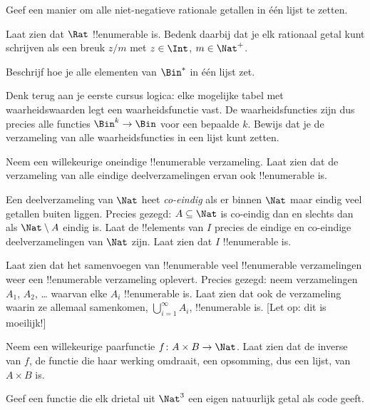 \documentclass[../../../include/open-logic-section]{subfiles}
\begin{document}
\begin{prob}
Geef een manier om alle niet-negatieve rationale getallen in één lijst
te zetten.
\end{prob}

\begin{prob}
Laat zien dat $\Rat$ !!{enumerable} is. Bedenk daarbij dat je elk
rationaal getal kunt schrijven als een breuk $z/m$ met $z \in \Int$,
$m \in \Nat^+$.
\end{prob}

\begin{prob}
Beschrijf hoe je alle elementen van $\Bin^*$ in één lijst zet.
\end{prob}

\begin{prob}
Denk terug aan je eerste cursus logica: elke mogelijke tabel met
waarheidswaarden legt een waarheidsfunctie vast. De waarheidsfuncties
zijn dus precies alle functies $\Bin^k \to \Bin$ voor een bepaalde
$k$. Bewijs dat je de verzameling van alle waarheidsfuncties in een
lijst kunt zetten.
\end{prob}

\begin{prob}
Neem een willekeurige oneindige !!{enumerable} verzameling. Laat zien
dat de verzameling van alle eindige deelverzamelingen ervan ook
!!{enumerable} is.
\end{prob}

\begin{prob}
Een deelverzameling van $\Nat$ heet \emph{co-eindig} als er binnen $\Nat$ maar
eindig veel getallen buiten liggen. Precies gezegd: $A \subseteq \Nat$
is co-eindig dan en slechts dan als $\Nat\setminus A$
eindig is. Laat de !!{element}s van $I$ precies de eindige en co-eindige
deelverzamelingen van $\Nat$ zijn. Laat zien dat $I$ !!{enumerable} is.
\end{prob}

\begin{prob}
Laat zien dat het samenvoegen van !!{enumerable} veel !!{enumerable}
verzamelingen weer een !!{enumerable} verzameling oplevert. Precies
gezegd: neem verzamelingen $A_1$, $A_2$, \dots{} waarvan elke $A_i$
!!{enumerable} is. Laat zien dat ook de verzameling waarin ze allemaal
samenkomen, $\bigcup_{i=1}^\infty A_i$, !!{enumerable} is. [Let op: dit
is moeilijk!]
\end{prob}

\begin{prob}
Neem een willekeurige paarfunctie $f \colon A \times B \to \Nat$.
Laat zien dat de inverse van $f$, de functie die haar werking omdraait,
een opsomming, dus een lijst, van $A \times B$ is.
\end{prob}

\begin{prob}
Geef een functie die elk drietal uit $\Nat^3$ een eigen natuurlijk
getal als code geeft.
\end{prob}
\end{document}
